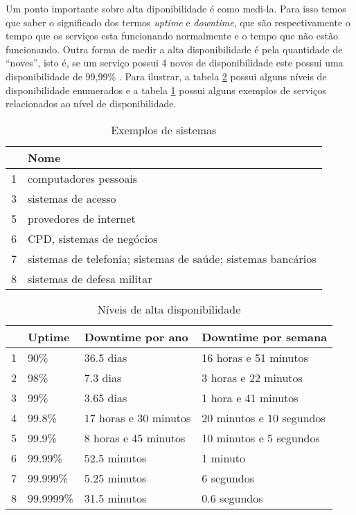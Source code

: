 Um ponto importante sobre alta diponibilidade é como medi-la. Para isso temos que saber o significado dos termos \textit{uptime} e 
\textit{downtime}, que são respectivamente o tempo que os serviços esta funcionando normalmente e o tempo que não estão funcionando.
Outra forma de medir a alta disponibilidade é pela quantidade de ``noves'', isto é, se um serviço possui 4 noves de disponibilidade
este possui uma disponibilidade de 99,99\% \cite{filho2004}.
Para ilustrar, a tabela \ref{tab:dispniveis} possui alguns níveis de disponibilidade enumerados e a 
tabela \ref{tab:dispexemplos} possui alguns exemplos de serviços relacionados ao nível de disponibilidade.
\begin{table}
\caption {Exemplos de sistemas}
\label{tab:dispexemplos} 
\begin{center}
\begin{tabular}{|l|l|}\hline
  & Nome\\\hline
1 & computadores pessoais\\\hline
3 & sistemas de acesso\\\hline
5 & provedores de internet\\\hline
6 & CPD, sistemas de negócios\\\hline
7 & sistemas de telefonia; sistemas de saúde; sistemas bancários\\\hline
8 & sistemas de defesa militar\\\hline
\end{tabular}
\end{center}
\end{table}

\begin{table}
\caption {Níveis de alta disponibilidade}
\label{tab:dispniveis} 
\begin{center}
\begin{tabular}{|l|l|l|l|}\hline
  & Uptime & Downtime por ano & Downtime por semana\\\hline
1 & 90\% & 36.5 dias & 16 horas e 51 minutos\\\hline
2 & 98\% & 7.3 dias & 3 horas e 22 minutos\\\hline
3 & 99\% & 3.65 dias & 1 hora e 41 minutos\\\hline
4 & 99.8\% & 17 horas e 30 minutos & 20 minutos e 10 segundos\\\hline
5 & 99.9\% & 8 horas e 45 minutos & 10 minutos e 5 segundos\\\hline
6 & 99.99\% & 52.5 minutos & 1 minuto\\\hline
7 & 99.999\% & 5.25 minutos & 6 segundos\\\hline
8 & 99.9999\% & 31.5 minutos & 0.6 segundos\\\hline
\end{tabular}
\end{center}
\end{table}

